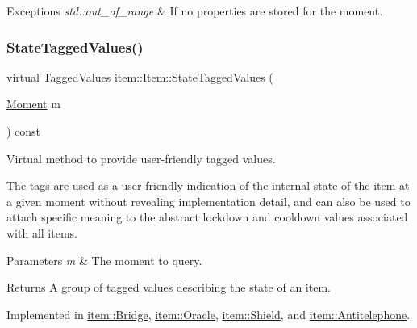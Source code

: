 \begin{DoxyExceptions}{Exceptions}
{\em std\+::out\+\_\+of\+\_\+range} & If no properties are stored for the moment. \\
\hline
\end{DoxyExceptions}
\mbox{\label{classitem_1_1_item_a8410ab3ab75e65360eddb4f6bd3cceff}} 
\subsubsection{\texorpdfstring{State\+Tagged\+Values()}{StateTaggedValues()}}
{\footnotesize\ttfamily virtual Tagged\+Values item\+::\+Item\+::\+State\+Tagged\+Values (\begin{DoxyParamCaption}\item[{\hyperlink{classtimeplane_1_1_moment}{Moment}}]{m }\end{DoxyParamCaption}) const\hspace{0.3cm}{\ttfamily [pure virtual]}}



Virtual method to provide user-\/friendly tagged values. 

The tags are used as a user-\/friendly indication of the internal state of the item at a given moment without revealing implementation detail, and can also be used to attach specific meaning to the abstract lockdown and cooldown values associated with all items. 
\begin{DoxyParams}{Parameters}
{\em m} & The moment to query. \\
\hline
\end{DoxyParams}
\begin{DoxyReturn}{Returns}
A group of tagged values describing the state of an item. 
\end{DoxyReturn}


Implemented in \hyperlink{classitem_1_1_bridge_a6339e1cd46f454625ef7cd6dc683f6cd}{item\+::\+Bridge}, \hyperlink{classitem_1_1_oracle_a78dd3984a5a0dae432c86e18520d7c46}{item\+::\+Oracle}, \hyperlink{classitem_1_1_shield_a1a246374ed47a4d9849bad97091c42cb}{item\+::\+Shield}, and \hyperlink{classitem_1_1_antitelephone_afe8ac703b5f19181f221afe07c05cae7}{item\+::\+Antitelephone}.

\mbox{\label{classitem_1_1_item_a8d78594540bff88538723a8a1fb881d5}} 
